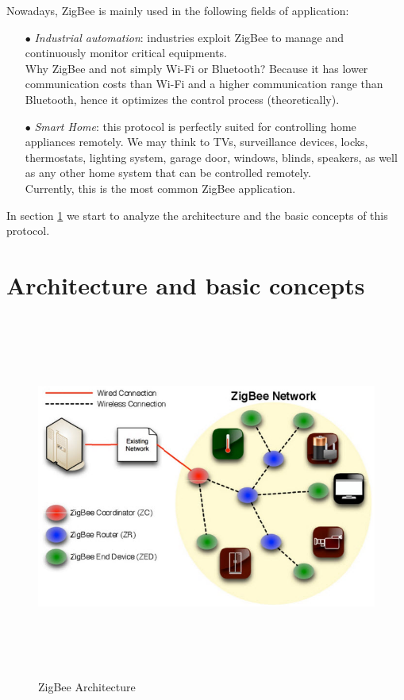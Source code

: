 \documentclass[12pt]{report}
\begin{document}
{{Nowadays, ZigBee is mainly used in the following fields of application:
\begin{itemize}
\setlength{\itemindent}{+4mm}
\item[$\bullet$] \emph{Industrial automation}: industries exploit ZigBee to manage and continuously monitor critical equipments.\\
Why ZigBee and not simply Wi-Fi or Bluetooth? Because it has lower communication costs than Wi-Fi and a higher communication range than Bluetooth, hence it optimizes the control process (theoretically).
\item[$\bullet$] \emph{Smart Home}: this protocol is perfectly suited for controlling home appliances remotely. We may think to TVs, surveillance devices, locks, thermostats, lighting system, garage door, windows, blinds, speakers, as well as any other home system that can be controlled remotely.\\
Currently, this is the most common ZigBee application.\\

\end{itemize}

In section \ref{sec:zigbeearch} we start to analyze the architecture and the basic concepts of this protocol.\\

\section{Architecture and basic concepts}
\label{sec:zigbeearch}
\bigskip

\begin{figure}[H]
\includegraphics[width=12cm,height=12cm,keepaspectratio]{zigbee_architecture}
\centering
\caption{ZigBee Architecture}
\label{fig:zigbeearch}
\end{figure}

}}
\end{document}
